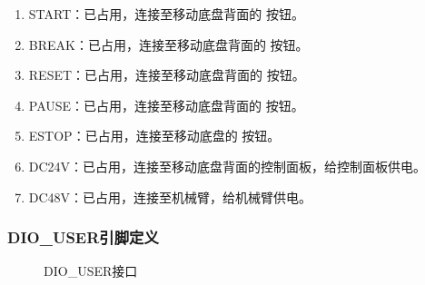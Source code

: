 \documentclass[a4paper,11pt,english,openany,oneside]{sphinxmanual}
\begin{document}
\begin{enumerate}
\item {} 
\sphinxAtStartPar
START：已占用，连接至移动底盘背面的  按钮。

\item {} 
\sphinxAtStartPar
BREAK：已占用，连接至移动底盘背面的  按钮。

\item {} 
\sphinxAtStartPar
RESET：已占用，连接至移动底盘背面的  按钮。

\item {} 
\sphinxAtStartPar
PAUSE：已占用，连接至移动底盘背面的  按钮。

\item {} 
\sphinxAtStartPar
ESTOP：已占用，连接至移动底盘的  按钮。

\item {} 
\sphinxAtStartPar
DC24V：已占用，连接至移动底盘背面的控制面板，给控制面板供电。

\item {} 
\sphinxAtStartPar
DC48V：已占用，连接至机械臂，给机械臂供电。

\end{enumerate}


\subsubsection{DIO\_USER引脚定义}
\label{\detokenize{08 _u5b89_u88c5_u4e0e_u8c03_u8bd5:dio-user}}\label{\detokenize{08 _u5b89_u88c5_u4e0e_u8c03_u8bd5:id27}}
\begin{figure}[H]
\centering
\capstart

\noindent{}
\caption{DIO\_USER接口}\label{\detokenize{08 _u5b89_u88c5_u4e0e_u8c03_u8bd5:id57}}\end{figure}
\end{document}
